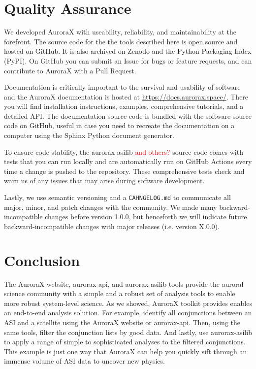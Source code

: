 \documentclass[draft]{agujournal2019}
\begin{document}
\section{Quality Assurance}
We developed AuroraX with useability, reliability, and maintainability at the forefront. The source code for the the tools described here is open source and hosted on GitHub. It is also archived on Zenodo and the Python Packaging Index (PyPI). On GitHub you can submit an Issue for bugs or feature requests, and can contribute to AuroraX with a Pull Request.  

Documentation is critically important to the survival and usability of software and the AuroraX documentation is hosted at \url{https://docs.aurorax.space/}. There you will find installation instructions, examples, comprehensive tutorials, and a detailed API. The documentation source code is bundled with the software source code on GitHub, useful in case you need to recreate the documentation on a computer using the Sphinx Python document generator.

To ensure code stability, the aurorax-asilib \textcolor{red}{and others?} source code comes with tests that you can run locally and are automatically run on GitHub Actions every time a change is pushed to the repository. These comprehensive tests check and warn us of any issues that may arise during software development.

Lastly, we use semantic versioning and a \verb|CAHNGELOG.md| to communicate all major, minor, and patch changes with the community. We made many backward-incompatible changes before version 1.0.0, but henceforth we will indicate future backward-incompatible changes with major releases (i.e. version X.0.0). 

\section{Conclusion}
The AuroraX website, aurorax-api, and aurorax-asilib tools provide the auroral science community with a simple and a robust set of analysis tools to enable more robust system-level science. As we showed, AuroraX toolkit provides enables an end-to-end analysis solution. For example, identify all conjunctions between an ASI and a satellite using the AuroraX website or aurorax-api. Then, using the same tools, filter the conjunction lists by good data. And lastly, use aurorax-asilib to apply a range of simple to sophisticated analyses to the filtered conjunctions. This example is just one way that AuroraX can help you quickly sift through an immense volume of ASI data to uncover new physics.
\end{document}
